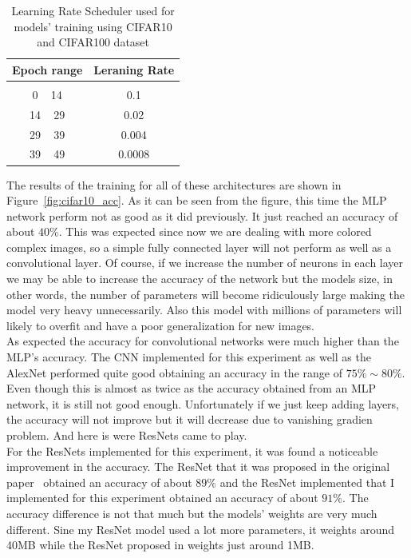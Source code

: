 \documentclass[english,preprint,JIP]{ipsj}
\begin{document}
\begin{table}
    \centering
    \caption{Learning Rate Scheduler used for models' training using CIFAR10 and CIFAR100 dataset}
    \begin{tabular}{c c}
        Epoch range & Leraning Rate \\
        \hline                      \\
        0 ~ 14      & 0.1           \\
        14 ~ 29     & 0.02          \\
        29 ~ 39     & 0.004         \\
        39 ~ 49     & 0.0008
    \end{tabular}
    \label{tab:learning_rate}
\end{table}

The results of the training for all of these architectures are shown in
Figure~\ref{fig:cifar10_acc}. As it can be seen from the figure, this time the
MLP network perform not as good as it did previously. It just reached an
accuracy of about $40\%$. This was expected since now we are dealing with more
colored complex images, so a simple fully connected layer will not perform as
well as a convolutional layer. Of course, if we increase the number of neurons
in each layer we may be able to increase the accuracy of the network but the
models size, in other words, the number of parameters will become ridiculously
large making the model very heavy unnecessarily. Also this model with millions
of parameters will likely to overfit and have a poor generalization for new
images.\\

As expected the accuracy for convolutional networks were much higher than the
MLP's accuracy. The CNN implemented for this experiment as well as the AlexNet
performed quite good obtaining an accuracy in the range of $75\% \sim 80\%$.
Even though this is almost as twice as the accuracy obtained from an MLP
network, it is still not good enough. Unfortunately if we just keep adding
layers, the accuracy will not improve but it will decrease due to vanishing
gradien problem. And here is were ResNets came to play.\\

For the ResNets implemented for this experiment, it was found a noticeable
improvement in the accuracy. The ResNet that it was proposed in the original
paper~\cite{resnet} obtained an accuracy of about $89\%$ and the ResNet
implemented that I implemented for this experiment obtained an accuracy of about
$91\%$. The accuracy difference is not that much but the models' weights are
very much different. Sine my ResNet model used a lot more parameters, it weights
around 40MB while the ResNet proposed in \cite{resnet} weights just around 1MB.\\
\end{document}
